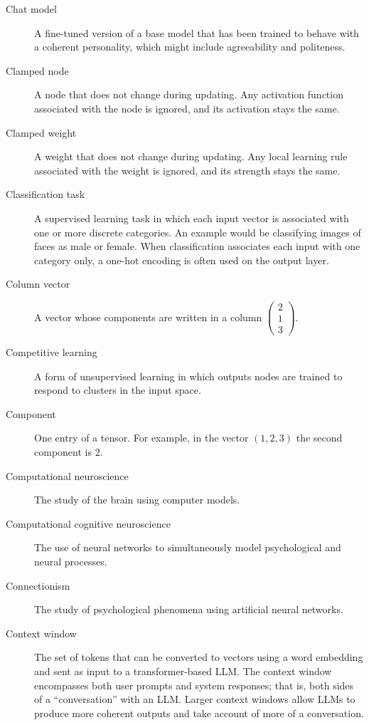 \begin{description}
\item[Chat model] A fine-tuned version of a base model that has been trained to behave with a coherent personality, which might include agreeability and politeness. 

\item[Clamped node] A node that does not change during updating. Any activation function associated with the node is ignored, and its activation stays the same.

\item[Clamped weight] A weight that does not change during updating. Any local learning rule associated with the weight is ignored, and its strength stays the same.

\item[Classification task] A supervised learning task in which each input vector is associated with one or more discrete  categories. An example would be classifying images of faces as male or female. When classification associates each input with one category only, a one-hot encoding is often used on the output layer.

\item[Column vector] A vector whose components are written in a column \eg $\displaystyle \begin{pmatrix} 2 \\ 1 \\ 3 \end{pmatrix}$.

\item[Competitive learning] A form of unsupervised learning in which outputs nodes are trained to respond to clusters in the input space. 

\item[Component] One entry of a tensor. For example, in the vector $(1,2,3)$ the second component is $2$.

\item[Computational neuroscience] The study of the brain using computer models.

\item[Computational cognitive neuroscience] The use of neural networks to simultaneously model psychological and neural processes.

\item[Connectionism] The study of psychological phenomena using artificial neural networks.

\item[Context window] The set of tokens that can be converted to vectors using a word embedding and sent as input to a transformer-based LLM.  The context window encompasses both user prompts and system responses; that is, both sides of a ``conversation'' with an LLM. Larger context windows allow LLMs to produce more coherent outputs and take account of more of a conversation.


\end{description}
